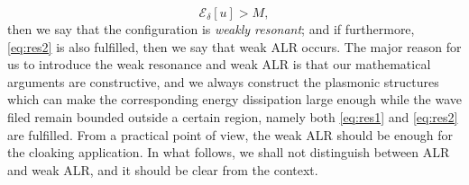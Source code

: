 \documentclass[11pt,reqno,twoside]{amsart}
\theoremstyle{definition}
\theoremstyle{remark}
\numberwithin{equation}{section}
\begin{document}
\begin{equation}\label{eq:res1}
\mathscr{E}_\delta[u]>M, 
\end{equation}
then we say that the configuration is {\it weakly resonant}; and if furthermore, \eqref{eq:res2} is also fulfilled, then we say that weak ALR occurs. The major reason for us to introduce the weak resonance and weak ALR is that our mathematical arguments are constructive, and we always construct the plasmonic structures which can make the corresponding energy dissipation large enough while the wave filed remain bounded outside a certain region, namely both \eqref{eq:res1} and \eqref{eq:res2} are fulfilled. From a practical point of view, the weak ALR should be enough for the cloaking application. In what follows, we shall not distinguish between ALR and weak ALR, and it should be clear from the context. 
\end{document}
